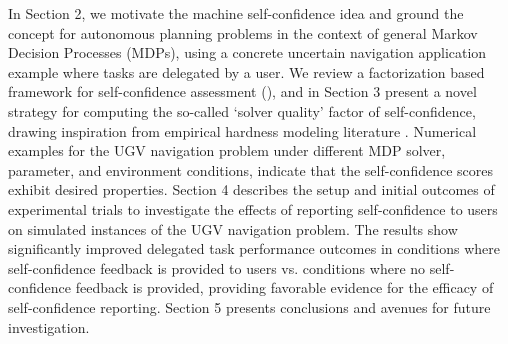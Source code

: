 In Section 2, we motivate the machine self-confidence idea and ground the concept for autonomous planning problems in the context of general Markov Decision Processes (MDPs), using a concrete uncertain navigation application example where tasks are delegated by a user. We review a factorization based framework for self-confidence assessment (\famsec), and in Section 3 present a novel strategy for computing the so-called `solver quality' factor of self-confidence, drawing inspiration from empirical hardness modeling literature \cite{Leyton-Brown2009-yr}. Numerical examples for the UGV navigation problem under different MDP solver, parameter, and environment conditions, indicate that the self-confidence scores exhibit desired properties. Section 4 describes the setup and initial outcomes of experimental trials to investigate the effects of reporting self-confidence to users on simulated instances of the UGV navigation problem. The results show significantly improved delegated task performance outcomes in conditions where self-confidence feedback is provided to users vs. conditions where no self-confidence feedback is provided, providing favorable evidence for the efficacy of self-confidence reporting. Section 5 presents conclusions and avenues for future investigation. %
